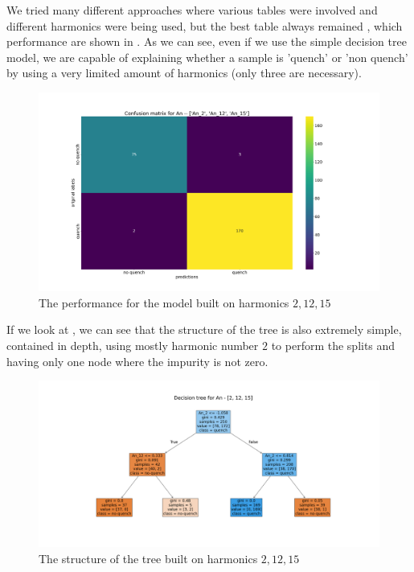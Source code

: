 We tried many different approaches where various tables were involved and different harmonics were
being used, but the best table always remained \an, which performance are shown in
. As we can see, even if we use the simple decision tree model, we are
capable of explaining whether a sample is 'quench' or 'non quench' by using a very limited amount of
harmonics (only three are necessary).
\begin{figure}[h!]
	\centering
	\includegraphics[width=\linewidth]{img/An_2_12_15_cm_dt.png}
	\caption{The performance for the \an model built on harmonics $2, 12, 15$} \label{fig:dt-an-2-12-15-perf}
\end{figure}
If we look at , we can see that the structure of the tree is also
extremely simple, contained in depth, using mostly harmonic number $2$ to perform the splits and
having only one node where the impurity is not zero.
\begin{figure}[h!]
	\centering
	\includegraphics[width=\linewidth]{img/An_2_12_15_pt_dt.png}
	\caption{The structure of the tree built on harmonics $2, 12, 15$} \label{fig:dt-an-2-12-15-pt}
\end{figure}
